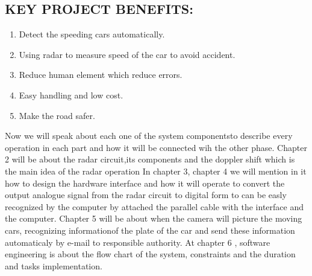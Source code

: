 \subsection{KEY PROJECT BENEFITS:}
\begin{enumerate}
	\item Detect the speeding cars automatically.
	\item Using radar to measure speed of the car to
	avoid accident.
	\item Reduce human element which reduce errors.
	\item Easy handling and low cost.
	\item Make the road safer.
\end{enumerate}
\noindent Now we will speak about each one of the system
componentsto describe every operation in each part and how
it will be connected wih the other phase.
Chapter 2 will be about the radar circuit,its components and
the doppler shift which is the main idea of the radar operation
In chapter 3, chapter 4 we will mention in it how to design
the hardware interface and how it will operate to convert the
output analogue signal from the radar circuit to digital form
to can be easly recognized by the computer by attached the
parallel cable with the interface and the computer.
Chapter 5 will be about when the camera will picture the
moving cars, recognizing informationof the plate of the car
and send these information automaticaly by e-mail to
responsible authority.
At chapter 6 , software engineering is about the flow chart of
the system, constraints and the duration and tasks
implementation.





